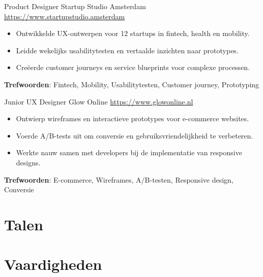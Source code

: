 \documentclass[a4paper, serif, 10pt]{moderncv}
\begin{document}
        {Product Designer}
        {Startup Studio Amsterdam}
        {\url{https://www.startupstudio.amsterdam}}
        {}
        {\begin{itemize}
\item Ontwikkelde UX-ontwerpen voor 12 startups in fintech, health en mobility.
\item Leidde wekelijks usabilitytesten en vertaalde inzichten naar prototypes.
\item Creëerde customer journeys en service blueprints voor complexe processen.
\end{itemize}
\textbf{Trefwoorden}: Fintech, Mobility, Usabilitytesten, Customer journey, Prototyping}

        {Junior UX Designer}
        {Glow Online}
        {\url{https://www.glowonline.nl}}
        {}
        {\begin{itemize}
\item Ontwierp wireframes en interactieve prototypes voor e-commerce websites.
\item Voerde A/B-tests uit om conversie en gebruiksvriendelijkheid te verbeteren.
\item Werkte nauw samen met developers bij de implementatie van responsive designs.
\end{itemize}
\textbf{Trefwoorden}: E-commerce, Wireframes, A/B-testen, Responsive design, Conversie}
\section{Talen}

\section{Vaardigheden}

\end{document}
